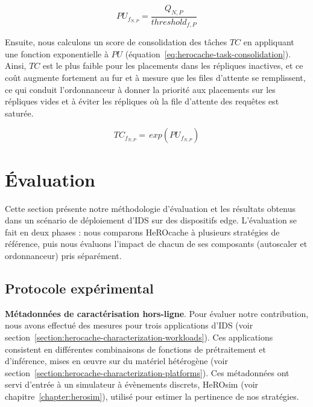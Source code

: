 {\begin{equation}
    PU_{f_{N, P}} = \frac{Q_{N, P}}{threshold_{f, P}}
\label{eq:herocache-platform-usage}
\end{equation}

Ensuite, nous calculons un score de consolidation des tâches $TC$ en appliquant une fonction exponentielle à $PU$ (équation~\ref{eq:herocache-task-consolidation}). Ainsi, $TC$ est le plus faible pour les placements dans les répliques inactives, et ce coût augmente fortement au fur et à mesure que les files d'attente se remplissent, ce qui conduit l'ordonnanceur à donner la priorité aux placements sur les répliques vides et à éviter les répliques où la file d'attente des requêtes est saturée.

\begin{equation}
    TC_{{f}_{N, P}} = \, exp(PU_{f_{N, P}})
\label{eq:herocache-task-consolidation}
\end{equation}

\section{Évaluation}
\label{section:herocache-evaluation}

Cette section présente notre méthodologie d'évaluation et les résultats obtenus dans un scénario de déploiement d'IDS sur des dispositifs edge. L'évaluation se fait en deux phases : nous comparons HeROcache à plusieurs stratégies de référence, puis nous évaluons l'impact de chacun de ses composants (autoscaler et ordonnanceur) pris séparément.

\subsection{Protocole expérimental}

\textbf{Métadonnées de caractérisation hors-ligne}. Pour évaluer notre contribution, nous avons effectué des mesures pour trois applications d'IDS (voir section~\ref{section:herocache-characterization-workloads}). Ces applications consistent en différentes combinaisons de fonctions de prétraitement et d'inférence, mises en œuvre sur du matériel hétérogène (voir section~\ref{section:herocache-characterization-platforms}). Ces métadonnées ont servi d'entrée à un simulateur à évènements discrets, HeROsim (voir chapitre~\ref{chapter:herosim}), utilisé pour estimer la pertinence de nos stratégies.

}
